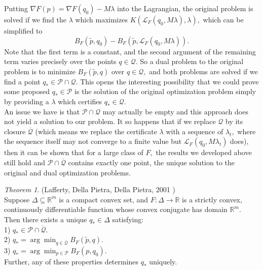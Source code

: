 \documentclass[BSc]{usydthesis}
\numberwithin{equation}{chapter}
\theoremstyle{remark}
\newtheorem{Theorem}[equation]{Theorem}
\newcommand{\la}{\lambda}
\newcommand{\Lag}{\mathcal{L}}
\begin{document}
Putting $\nabla F(p) = \nabla F(q_0) - M\lambda$ into the Lagrangian, the original problem is solved if we find the $\la$ which maximizes $K(\mathcal{L}_F(q_0, M\lambda), \lambda),$ which can be simplified to $$B_F(\tilde{p}, q_0) - B_F(\tilde{p}, \mathcal{L}_F(q_0, M\lambda)).$$ Note that the first term is a constant, and the second argument of the remaining term varies precisely over the points $q\in \mathcal{Q}.$ So a dual problem to the original problem is to minimize $B_F(\tilde{p}, q)$ over $q\in \mathcal{Q},$ and both problems are solved if we find a point $q_* \in \mathcal{P}\cap \mathcal{Q}.$ This opens the interesting possibility that we could prove some proposed $q_*\in\mathcal{P}$ is the solution of the original optimization problem simply by providing a $\la$ which certifies $q_*\in \mathcal{Q}.$ \\

An issue we have is that $\mathcal{P}\cap \mathcal{Q}$ may actually be empty and this approach does not yield a solution to our problem. It so happens that if we replace $\mathcal{Q}$ by its closure $\overline{\mathcal{Q}}$ (which means we replace the certificate $\la$ with a sequence of $\la_t,$ where the sequence itself may not converge to a finite value but $\Lag_F(q_0, M\la_t)$ does), then it can be shown that for a large class of $F,$ the results we developed above still hold and $\mathcal{P} \cap \overline{\mathcal{Q}}$ contains exactly one point, the unique solution to the original and dual optimization problems.  

\begin{Theorem}\label{pie} (Lafferty, Della Pietra, Della Pietra, 2001 \cite{pietra}) \\
 Suppose $\Delta\subseteq \mathbb{R}^m$ is a compact convex set, and $F:\Delta \to\mathbb{R}$ is a strictly convex, continuously differentiable function whose convex conjugate has domain $\mathbb{R}^m.$ Then there exists a unique $q_*\in \Delta$ satisfying:\\
 1) $q_* \in \mathcal{P} \cap \overline{\mathcal{Q}}.$\\
 2) $q_* = \arg \min_{q\in \overline{\mathcal{Q}}} B_F (\tilde{p}, q).$\\
 3) $q_* = \arg \min_{p\in \mathcal{P}} B_F(p, q_0).$\\
 Further, any of these properties determines $q_*$ uniquely. 
\end{Theorem}
\end{document}
